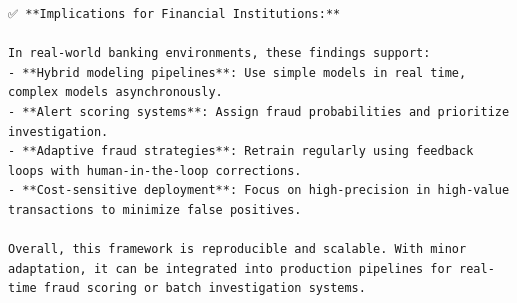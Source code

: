 \documentclass[
  letterpaper,
  DIV=11,
  numbers=noendperiod]{scrartcl}
\begin{document}
\begin{verbatim}
✅ **Implications for Financial Institutions:**

In real-world banking environments, these findings support:
- **Hybrid modeling pipelines**: Use simple models in real time, complex models asynchronously.
- **Alert scoring systems**: Assign fraud probabilities and prioritize investigation.
- **Adaptive fraud strategies**: Retrain regularly using feedback loops with human-in-the-loop corrections.
- **Cost-sensitive deployment**: Focus on high-precision in high-value transactions to minimize false positives.

Overall, this framework is reproducible and scalable. With minor adaptation, it can be integrated into production pipelines for real-time fraud scoring or batch investigation systems.
\end{verbatim}
\end{document}
